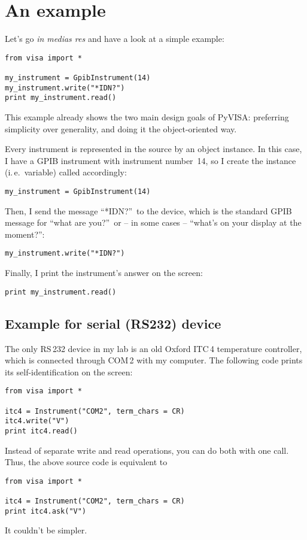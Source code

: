 \documentclass{howto}
\begin{document}
\section{An example}

Let's go \emph{in medias res} and have a look at a simple example:
\begin{verbatim}
from visa import *

my_instrument = GpibInstrument(14)
my_instrument.write("*IDN?")
print my_instrument.read()
\end{verbatim}
This example already shows the two main design goals of PyVISA: preferring
simplicity over generality, and doing it the object-oriented way.

Every instrument is represented in the source by an object instance.  In this case,
I have a GPIB instrument with instrument number~14, so I create the instance
(i.\,e.\ variable) called  accordingly:
\begin{verbatim}
my_instrument = GpibInstrument(14)
\end{verbatim}
Then, I send the message ``*IDN?''\ to the device, which is the standard GPIB
message for ``what are you?''\ or -- in some cases -- ``what's on your display
at the moment?'':
\begin{verbatim}
my_instrument.write("*IDN?")
\end{verbatim}
Finally, I print the instrument's answer on the screen:
\begin{verbatim}
print my_instrument.read()
\end{verbatim}


\subsection{Example for serial (RS232) device}

The only RS\,232 device in my lab is an old Oxford ITC\,4 temperature
controller, which is connected through COM\,2 with my computer.  The following
code prints its self-identification on the screen:
\begin{verbatim}
from visa import *

itc4 = Instrument("COM2", term_chars = CR)
itc4.write("V")
print itc4.read()
\end{verbatim}
Instead of separate write and read operations, you can do both with one
 call.  Thus, the above source code is equivalent to
\begin{verbatim}
from visa import *

itc4 = Instrument("COM2", term_chars = CR)
print itc4.ask("V")
\end{verbatim}
It couldn't be simpler.
\end{document}
